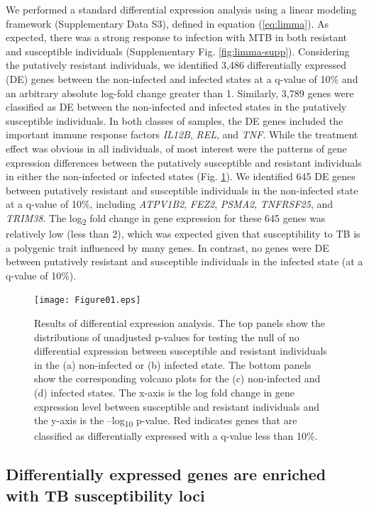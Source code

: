 \documentclass[fleqn,10pt]{wlscirep}
\begin{document}
We performed a standard differential expression analysis using a
linear modeling framework (Supplementary Data S3), defined in equation
(\ref{eq:limma}). As expected, there was a strong response to
infection with MTB in both resistant and susceptible individuals
(Supplementary Fig. \ref{fig:limma-supp}). Considering the putatively
resistant individuals, we identified 3,486 differentially expressed
(DE) genes between the non-infected and infected states at a q-value
of 10\% and an arbitrary absolute log-fold change greater than 1.
Similarly, 3,789 genes were classified as DE between the non-infected
and infected states in the putatively susceptible individuals. In both
classes of samples, the DE genes included the important immune
response factors \emph{IL12B}, \emph{REL}, and \emph{TNF}. While the
treatment effect was obvious in all individuals, of most interest were
the patterns of gene expression differences between the putatively
susceptible and resistant individuals in either the non-infected or
infected states (Fig. \ref{fig:limma}). We identified 645 DE genes
between putatively resistant and susceptible individuals in the
non-infected state at a q-value of 10\%, including \emph{ATPV1B2},
\emph{FEZ2}, \emph{PSMA2}, \emph{TNFRSF25}, and \emph{TRIM38}. The
log\textsubscript{2} fold change in gene expression for these 645
genes was relatively low (less than 2), which was expected given that
susceptibility to TB is a polygenic trait influenced by many genes. In
contrast, no genes were DE between putatively resistant and
susceptible individuals in the infected state (at a q-value of 10\%).

\begin{figure}[p]
\centering
\texttt{[image: Figure01.eps]}
\caption{
Results of differential expression analysis. The top panels show the
distributions of unadjusted p-values for testing the null of no
differential expression between susceptible and resistant individuals
in the (a) non-infected or (b) infected state. The bottom panels show
the corresponding volcano plots for the (c) non-infected and (d)
infected states. The x-axis is the log fold change in gene expression
level between susceptible and resistant individuals and the y-axis is
the –log\textsubscript{10} p-value. Red indicates genes that are
classified as differentially expressed with a q-value less than 10\%.
}
\label{fig:limma}
\end{figure}
\subsection*{Differentially expressed genes are enriched with TB susceptibility loci}
\end{document}
